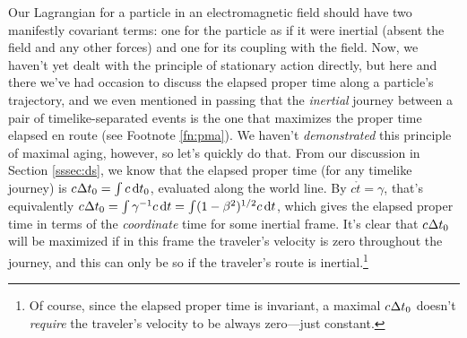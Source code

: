 \documentclass[12pt]{article}
\newcommand{\dd}[1]{\mathrm{d}#1}
\begin{document}
Our Lagrangian for a particle in an electromagnetic field should have two manifestly covariant terms: one for the particle as if it were inertial (absent the field and any other forces) and one for its coupling with the field. Now, we haven't yet dealt with the principle of stationary action directly, but here and there we've had occasion to discuss the elapsed proper time along a particle's trajectory, and we even mentioned in passing that the \emph{inertial} journey between a pair of timelike-separated events is the one that maximizes the proper time elapsed en route (see Footnote \ref{fn:pma}). We haven't \emph{demonstrated} this principle of maximal aging, however, so let's quickly do that. From our discussion in Section \ref{sssec:ds}, we know that the elapsed proper time (for any timelike journey) is $c \mkern.5mu \Delta t_0 = \int c \, \dd t_0$, evaluated along the world line. By $c\mathring{t} = \gamma$, that's equivalently $c \mkern.5mu \Delta t_0 = \int \gamma^{-1} c \, \dd t = \int (1 - \beta^2)^{1/2} c \, \dd t $, which gives the elapsed proper time in terms of the \emph{coordinate} time for some inertial frame. It's clear that $c \mkern.5mu \Delta t_0$ will be maximized if in this frame the traveler's velocity is zero throughout the journey, and this can only be so if the traveler's route is inertial.\footnote{Of course, since the elapsed proper time is invariant, a maximal $c \mkern.5mu \Delta t_0$ doesn't \emph{require} the traveler's velocity to be always zero---just constant.}
\end{document}
